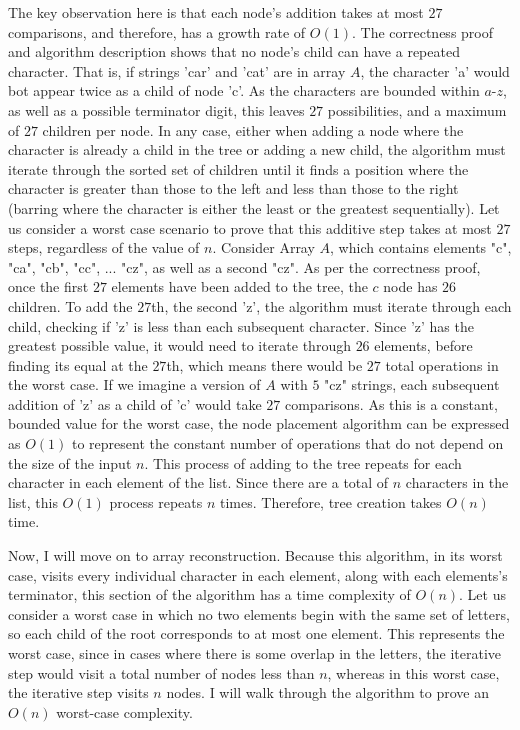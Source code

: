\documentclass[11pt]{article}
\begin{document}
The key observation here is that each node's addition takes at most $27$ comparisons, and therefore, has a growth rate of $O(1)$. 
The correctness proof and algorithm description shows that no node's child can have a repeated character. 
That is, if strings 'car' and 'cat' are in array $A$, the character 'a' would bot appear twice as a child of node 'c'. 
As the characters are bounded within $a$-$z$, as well as a possible terminator digit, this leaves $27$ possibilities, and a maximum of $27$ children per node. 
In any case, either when adding a node where the character is already a child in the tree or adding a new child, 
the algorithm must iterate through the sorted set of children until it finds a position where the character is greater than those to the left 
and less than those to the right (barring where the character is either the least or the greatest sequentially). 
Let us consider a worst case scenario to prove that this additive step takes at most $27$ steps, regardless of the value of $n$. 
Consider Array $A$, which contains elements "c", "ca", "cb", "cc", ... "cz", as well as a second "cz". 
As per the correctness proof, once the first $27$ elements have been added to the tree, the $c$ node has $26$ children. 
To add the $27$th, the second 'z', the algorithm must iterate through each child, checking if 'z' is less than each subsequent character. 
Since 'z' has the greatest possible value, it would need to iterate through $26$ elements, before finding its equal at the $27$th, 
which means there would be $27$ total operations in the worst case. If we imagine a version of $A$ with $5$ "cz" strings, each subsequent addition of 
'z' as a child of 'c' would take $27$ comparisons. As this is a constant, bounded value for the worst case, 
the node placement algorithm can be expressed as $O(1)$ to represent the constant number of operations that do not depend on the size 
of the input $n$. This process of adding to the tree repeats for each character in each element of the list. 
Since there are a total of $n$ characters in the list, this $O(1)$ process repeats $n$ times. 
Therefore, tree creation takes $O(n)$ time.

Now, I will move on to array reconstruction. Because this algorithm, in its worst case, visits every individual character in each element, 
along with each elements's terminator, this section of the algorithm has a time complexity of $O(n)$. 
Let us consider a worst case in which no two elements begin with the same set of letters, so each child of the root corresponds to at most one element. 
This represents the worst case, since in cases where there is some overlap in the letters, 
the iterative step would visit a total number of nodes less than $n$, whereas in this worst case, the iterative step visits $n$ nodes. 
I will walk through the algorithm to prove an $O(n)$ worst-case complexity.
\end{document}
